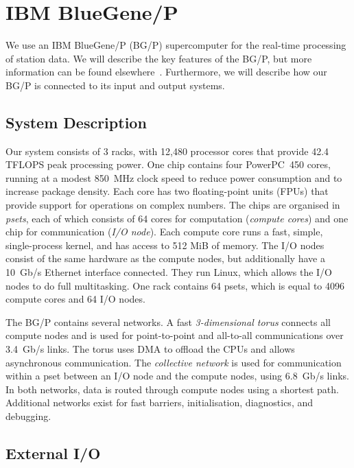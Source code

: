 \documentclass{llncs}
\begin{document}
\section{IBM BlueGene/P}

We use an IBM BlueGene/P (BG/P) supercomputer for the real-time processing of station data. We will describe the key features of the BG/P, but more information can be found elsewhere~\cite{IBM:08}. Furthermore, we will describe how our BG/P is connected to its input and output systems.

\subsection{System Description}

Our system consists of 3 racks, with 12,480 processor cores that provide 42.4 TFLOPS peak processing power. One chip contains four PowerPC~450 cores, running at a modest 850~MHz clock speed to reduce power consumption and to increase package density. Each core has two floating-point units (FPUs) that provide support for operations on complex numbers. The chips are organised in \emph{psets}, each of which consists of 64 cores for computation (\emph{compute cores}) and one chip for communication (\emph{I/O node}). Each compute core runs a fast, simple, single-process kernel,  and has access to 512 MiB of memory. The I/O nodes consist of the same hardware as the compute nodes, but additionally have a 10~Gb/s Ethernet interface connected. They run Linux, which allows the I/O nodes to do full multitasking. One rack contains 64 psets, which is equal to 4096 compute cores and 64 I/O nodes.

The BG/P contains several networks. A fast \emph{3-dimensional torus\/} connects all compute nodes and is used for point-to-point and all-to-all communications over 3.4~Gb/s links. The torus uses DMA to offload the CPUs and allows asynchronous communication. The \emph{collective network\/} is used for communication within a pset between an I/O node and the compute nodes, using 6.8~Gb/s links. In both networks, data is routed through compute nodes using a shortest path. Additional networks exist for fast barriers, initialisation, diagnostics, and debugging.

\subsection{External I/O}
\label{Sec:Networks}
\end{document}

